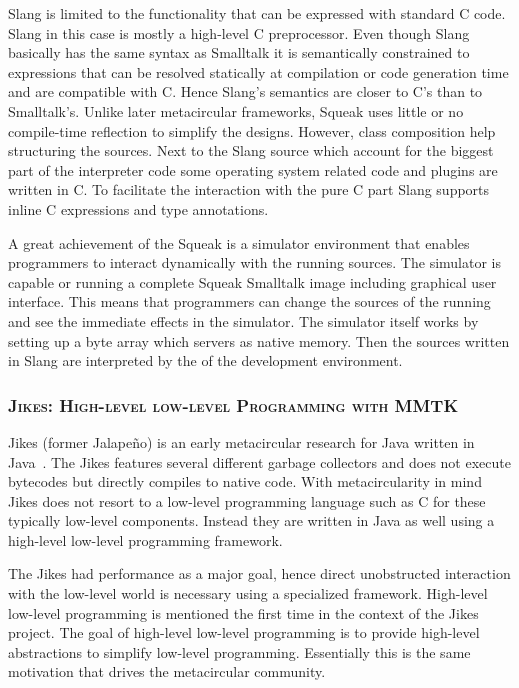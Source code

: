 Slang is limited to the functionality that can be expressed with standard C code.
Slang in this case is mostly a high-level C preprocessor.
Even though Slang basically has the same syntax as Smalltalk it is semantically constrained to expressions that can be resolved statically at compilation or code generation time and are compatible with C.
Hence Slang's semantics are closer to C's than to Smalltalk's.
Unlike later metacircular frameworks, Squeak uses little or no compile-time reflection to simplify the \VM designs.
However, class composition help structuring the sources.
Next to the Slang source which account for the biggest part of the interpreter code some operating system related code and plugins are written in C.
To facilitate the interaction with the pure C part Slang supports inline C expressions and type annotations.

A great achievement of the Squeak \VM is a simulator environment that enables programmers to interact dynamically with the running \VM sources.
The simulator is capable or running a complete Squeak Smalltalk image including graphical user interface.
This means that programmers can change the sources of the running \VM and see the immediate effects in the simulator.
The simulator itself works by setting up a byte array which servers as native memory.
Then the \VM sources written in Slang are interpreted by the \VM of the development environment.

\subsubsection*{\textsc{Jikes: High-level low-level Programming with MMTK}}
Jikes (former Jalapeño) is an early metacircular research \VM for Java written in Java~\cite{Alpe00a}.
The Jikes \VM features several different garbage collectors and does not execute bytecodes but directly compiles to native code.
With metacircularity in mind Jikes does not resort to a low-level programming language such as C for these typically low-level \VM components.
Instead they are written in Java as well using a high-level low-level programming framework.

The Jikes \VM had performance as a major goal, hence direct unobstructed interaction with the low-level world is necessary using a specialized framework.
High-level low-level programming \cite{Fram09a} is mentioned the first time in the context of the Jikes \VM project.
The goal of high-level low-level programming is to provide high-level abstractions to simplify low-level programming.
Essentially this is the same motivation that drives the metacircular \VM community.

